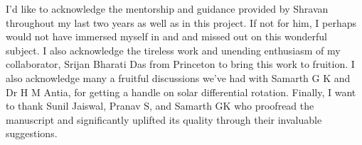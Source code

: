 
\begin{acknowledgements}      

I'd like to acknowledge the mentorship and guidance provided by Shravan throughout my last two years as well as in this project. If not for him, I perhaps would not have immersed myself in and and missed out on this wonderful subject. I also acknowledge the tireless work and unending enthusiasm of my collaborator, Srijan Bharati Das from Princeton to bring this work to fruition. I also acknowledge many a fruitful discussions we've had with Samarth G K and Dr H M Antia, for getting a handle on solar differential rotation. Finally, I want to thank Sunil Jaiswal, Pranav S, and Samarth GK who proofread the manuscript and significantly uplifted its quality through their invaluable suggestions.
\end{acknowledgements}